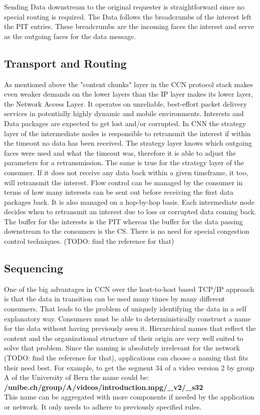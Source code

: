 \vspace{5mm} %

Sending Data downstream to the original requester is straightforward since no special routing is required. The Data follows the breadcrumbs of the interest left the PIT entries. These breadcrumbs are the incoming faces the interest and serve as the outgoing faces for the data message.

\subsection{Transport and Routing}

As mentioned above the "content chunks" layer in the CCN protocol stack makes even weaker demands on the lower layers than the IP layer makes its lower layer, the Network Access Layer. It operates on unreliable, best-effort packet delivery services in potentially highly dynamic and mobile environments. Interests and Data packages are expected to get lost and/or corrupted. In CNN the strategy layer of the intermediate nodes is responsible to retransmit the interest if within the timeout no data has been received. The strategy layer knows which outgoing faces were used and what the timeout was, therefore it is able to adjust the parameters for a retransmission. The same is true for the strategy layer of the consumer. If it does not receive any data back within a given timeframe, it too, will retransmit the interest.
Flow control can be managed by the consumer in terms of how many interests can be sent out before receiving the first data packages back. It is also managed on a hop-by-hop basis. Each intermediate node decides when to retransmit an interest due to loss or corrupted data coming back. The buffer for the interests is the PIT whereas the buffer for the data passing downstream to the consumers is the CS. There is no need for special congestion control techniques. (TODO: find the reference for that)

\subsection{Sequencing}

One of the big advantages in CCN over the host-to-host based TCP/IP approach is that the data in transition can be used many times by many different consumers. That leads to the problem of uniquely identifying the data in a self explanatory way. Consumers must be able to deterministically construct a name for the data without having previously seen it. Hierarchical names that reflect the content and the organizational structure of their origin are very well suited to solve that problem. Since the naming is absolutely irrelevant for the network (TODO: find the reference for that), applications can choose a naming that fits their need best. For example, to get the segment 34 of a video version 2 by group A of the University of Bern the name could be: \textbf{/unibe.ch/group/A/videos/introduction.mpg/\_v2/\_s32}\\
This name can be aggregated with more components if needed by the application or network. It only needs to adhere to previously specified rules.


